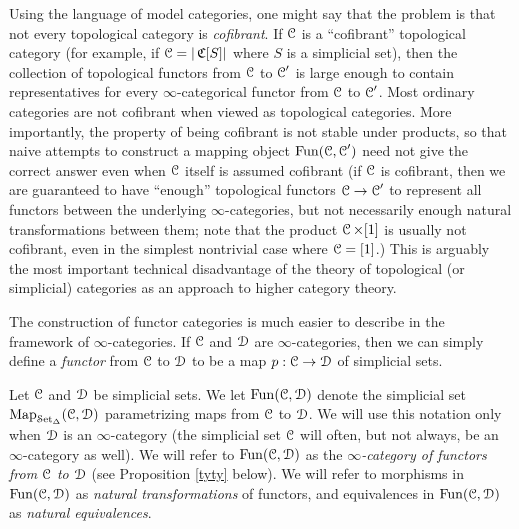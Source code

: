 \begin{1.2.7 Functors between higher cats}
\begin{remark}
Using the language of model categories, one might say that the
problem is that not every topological category is {\it cofibrant}.
If $\operatorname{\mathcal{C}}$ is a ``cofibrant'' topological category (for example, if $\operatorname{\mathcal{C}} =
|\operatorname{\mathfrak{C}}[S]|$ where $S$ is a simplicial set), then the collection of topological
functors from $\operatorname{\mathcal{C}}$ to $\operatorname{\mathcal{C}}'$ is large enough to contain representatives for
every $\infty$-categorical functor from $\operatorname{\mathcal{C}}$ to $\operatorname{\mathcal{C}}'$. Most
ordinary categories are not cofibrant when viewed as topological categories.
More importantly, the property of being cofibrant is not stable under products, so that naive attempts to construct a mapping object $\operatorname{Fun}(\operatorname{\mathcal{C}}, \operatorname{\mathcal{C}}')$ need not give the correct answer even when $\operatorname{\mathcal{C}}$ itself is assumed cofibrant (if $\operatorname{\mathcal{C}}$ is cofibrant, then we are guaranteed to have ``enough'' topological functors $\operatorname{\mathcal{C}} \rightarrow \operatorname{\mathcal{C}}'$ to represent all functors between the underlying $\infty$-categories, but not necessarily enough natural transformations between them; note that the product $\operatorname{\mathcal{C}} \times [1]$ is usually not cofibrant, even in the simplest nontrivial case where $\operatorname{\mathcal{C}} = [1]$.) This is arguably the most important technical disadvantage of the theory of topological (or simplicial) categories as an approach to higher category theory.
\end{remark}

The construction of functor categories is much easier to describe in the framework of $\infty$-categories. If $\operatorname{\mathcal{C}}$ and $\operatorname{\mathcal{D}}$ are
$\infty$-categories, then we can simply define a {\it functor} from
$\operatorname{\mathcal{C}}$ to $\operatorname{\mathcal{D}}$ to be a map $p: \operatorname{\mathcal{C}} \rightarrow \operatorname{\mathcal{D}}$ of simplicial sets.

\begin{notation}
Let $\operatorname{\mathcal{C}}$ and $\operatorname{\mathcal{D}}$ be simplicial sets. We let $\operatorname{Fun}(\operatorname{\mathcal{C}}, \operatorname{\mathcal{D}})$ denote the
simplicial set $\operatorname{{Map}}_{\operatorname{\mathcal{S}et_{\Delta}}}(\operatorname{\mathcal{C}}, \operatorname{\mathcal{D}})$ parametrizing maps from $\operatorname{\mathcal{C}}$ to $\operatorname{\mathcal{D}}$.
We will use this notation only when $\operatorname{\mathcal{D}}$ is an $\infty$-category (the simplicial set $\operatorname{\mathcal{C}}$ will often, but not always, be an $\infty$-category as well). We will refer to $\operatorname{Fun}(\operatorname{\mathcal{C}}, \operatorname{\mathcal{D}})$ as the
{\it $\infty$-category of functors from $\operatorname{\mathcal{C}}$ to $\operatorname{\mathcal{D}}$} (see Proposition \ref{tyty} below).
We will refer to morphisms in $\operatorname{Fun}(\operatorname{\mathcal{C}}, \operatorname{\mathcal{D}})$ as {\it natural transformations} of functors, and
equivalences in $\operatorname{Fun}(\operatorname{\mathcal{C}}, \operatorname{\mathcal{D}})$ as {\it natural equivalences}.
\end{notation}


\end{1.2.7 Functors between higher cats}
